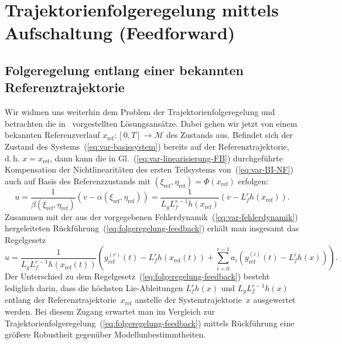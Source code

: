 \section{Trajektorienfolgeregelung mittels Aufschaltung (Feed\-forward)\label{sec:Trajektorienfolgeregelung-Feedforward}}

\subsection{Folgeregelung entlang einer bekannten Referenztrajektorie}

Wir widmen uns weiterhin dem Problem der Trajektorienfolgeregelung
und betrachten die in~\cite{hagenmeyer2003lncis,hagenmeyer2003}\nocite{zinober2003}
vorgestellten Lösungsansätze. Dabei gehen wir jetzt von einem bekannten
Referenzverlauf $x_{\text{ref}}:[0,T]\to\mathcal{M}$ des Zustands
aus. Befindet sich der Zustand des Systems~(\ref{eq:var-basissystem})
bereits auf der Referenztrajektorie, d.\,h. $x=x_{\text{ref}}$,
dann kann die in Gl.~(\ref{eq:var-linearisierung-FB}) durchgeführte
Kompensation der Nichtlinearitäten des ersten Teilsystems von~(\ref{eq:var-BI-NF})
auch auf Basis des Referenzzustands mit $(\xi_{\text{ref}},\eta_{\text{ref}})=\Phi(x_{\text{ref}})$
erfolgen: 
\begin{equation}
u=\frac{1}{\beta(\xi_{\text{ref}},\eta_{\text{ref}})}\left(v-\alpha(\xi_{\text{ref}},\eta_{\text{ref}})\right)=\frac{1}{L_{g}L_{f}^{r-1}h(x_{\text{ref}})}\left(v-L_{f}^{r}h(x_{\text{ref}})\right).\label{eq:var-linearisierung-FF}
\end{equation}
Zusammen mit der aus der vorgegebenen Fehlerdynamik~(\ref{eq:var-fehlerdynamik})
hergeleiteten Rückführung~(\ref{eq:folgeregelung-feedback}) erhält
man insgesamt das Regelgesetz 
\begin{equation}
u=\frac{1}{L_{g}L_{f}^{r-1}h(x_{\text{ref}}(t))}\left(y_{\text{ref}}^{(r)}(t)-L_{f}^{r}h(x_{\text{ref}}(t))+\sum_{i=0}^{r-1}a_{i}\left(y_{\text{ref}}^{(i)}(t)-L_{f}^{i}h(x)\right)\right).\label{eq:folgeregelung-feedforward}
\end{equation}
Der Unterschied zu dem Regelgesetz~(\ref{eq:folgeregelung-feedback})
besteht lediglich darin, dass die höchsten Lie-Ableitungen $L_{f}^{r}h(x)$
und $L_{g}L_{f}^{r-1}h(x)$ entlang der Referenztrajektorie~$x_{\text{ref}}$
anstelle der Systemtrajektorie~$x$ ausgewertet werden. Bei diesem
Zugang erwartet man im Vergleich zur Trajektorienfolgeregelung~(\ref{eq:folgeregelung-feedback})
mittels Rückführung eine größere Robustheit gegenüber Modellunbestimmtheiten.

